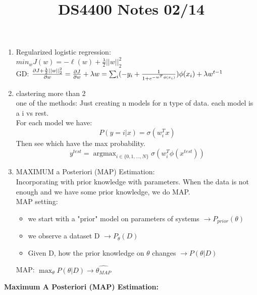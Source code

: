 \documentclass[12pt]{article}
\DeclareMathOperator*{\argmax}{\arg\max}
\begin{document}
\begin{enumerate}
            \item Regularized logistic regression:\\
            $min_w J(w) = -\ell(w) + \frac{\lambda}{2}||w||_2^2$ \\
            GD: $\frac{\partial J + \frac{\lambda}{2}||w||_2^2}{\partial w} = \frac{\partial J}{\partial w} + \lambda w\\
            = \sum_i (-y_i + \frac{1}{1 + e^{-w^T\phi(x_i)}})\phi(x_i) + \lambda w^{t-1}$

            \item clastering more than 2\\
            one of the methods: Just creating n models for n type of data. each model is a i vs rest.\\
            For each model we have:
            $$P(y = i | x) = \sigma(w_i^T x)$$
            Then see which have the max probability.
            $$y^{test} = \argmax_{i \in \{0,1,\dots, N\}} \sigma (w^T_i \phi(x^{test}))$$

            \item MAXIMUM a Posteriori (MAP) Estimation:\\
            Incorporating with prior knowledge with parameters. When the data is not enough and we have some prior knowledge, we do MAP.\\
            MAP setting: 
            \begin{itemize}
                \item we start with a "prior" model on parameters of systems $\rightarrow P_{prior}(\theta)$
                \item we observe a dataset D $\rightarrow P_\theta(D)$
                \item Given D, how the prior knowledge on $\theta$ changes $\rightarrow P(\theta | D)$
            \end{itemize}
            MAP: $\max_\theta P(\theta | D) \rightarrow \hat{\theta_{MAP}}$
        \end{enumerate}
        
        \title{DS4400 Notes 02/14}
        \maketitle

        \textbf{Maximum A Posteriori (MAP) Estimation:}
        
\end{document}
